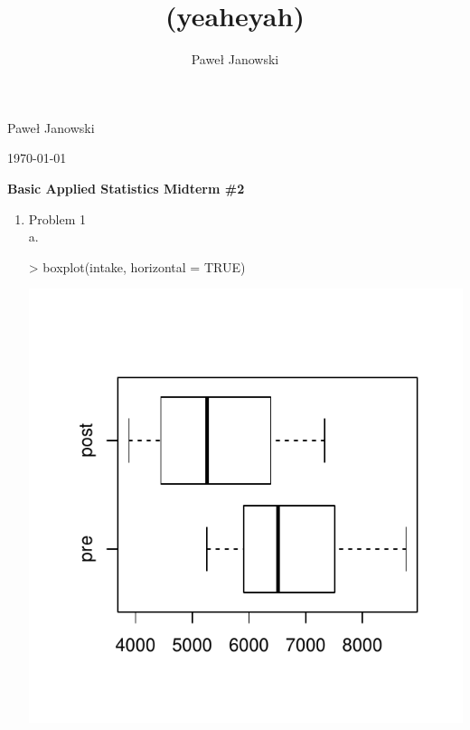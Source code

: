 \documentclass[11pt,letterpaper]{article}
\title{(yeaheyah)}
\author{Pawe\l{} Janowski}
\begin{document}
\begin{flushright}
\parskip 0pt
Pawe\l{} Janowski
 
\today
\vspace{10 mm}
\end{flushright}
\begin{center}
\begin{Large}
\textbf{Basic Applied Statistics
Midterm \#2}
\vspace{10 mm}
\end{Large}
\end{center}


\begin{enumerate}
\item Problem 1 \\
a.\\
\begin{Schunk}
\begin{Sinput}
> boxplot(intake, horizontal = TRUE)
\end{Sinput}
\end{Schunk}
\includegraphics{midterm2-001}
\\


\end{enumerate}
\end{document}
